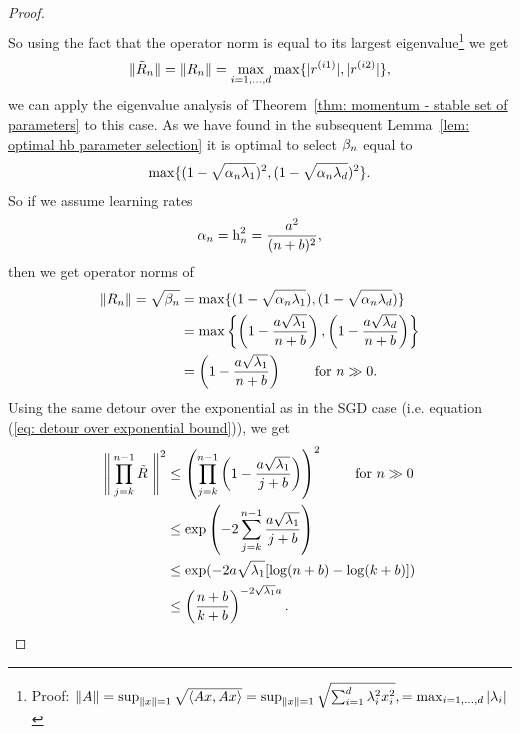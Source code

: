 \begin{proof}
\begin{align*}
	\end{align*}
	So using the fact that the operator norm is equal to its largest eigenvalue\footnote{
		Proof: \(
			\|A\|
			= \sup_{\|x\| =1} \sqrt{\langle Ax, Ax\rangle}
			= \sup_{\|x\| =1} \sqrt{\sum_{i=1}^d \lambda_i^2 x_i^2},
			= \max_{i=1,\dots,d} |\lambda_i|
		\)
	}
	we get
	\begin{align*}
		\|\tilde{R}_n\|=\|R_n\|
		=\max_{i=1,\dots, d} \max\{|r^{(i1)}|,|r^{(i2)}|\},
	\end{align*}
	we can apply the eigenvalue analysis of
	Theorem~\ref{thm: momentum - stable set of parameters} to this case. As we have
	found in the subsequent Lemma~\ref{lem: optimal hb parameter selection} it is
	optimal to select \(\beta_n\) equal to
	\begin{align*}
		\max\{(1-\sqrt{\alpha_n\lambda_1})^2, (1-\sqrt{\alpha_n\lambda_d})^2\}.
	\end{align*}
	So if we assume learning rates
	\begin{align*}
		\alpha_n = \text{h}_n^2 = \frac{a^2}{(n+b)^2},
	\end{align*}
	then we get operator norms of 
	\begin{align*}
		\|R_n\| = \sqrt{\beta_n}
		&= \max\{(1-\sqrt{\alpha_n\lambda_1}), (1-\sqrt{\alpha_n\lambda_d})\}\\
		&= \max\left\{
			\left(1-\frac{a\sqrt{\lambda_1}}{n+b}\right),
			\left(1-\frac{a\sqrt{\lambda_d}}{n+b}\right)
		\right\}\\
		&= \left(1-\frac{a\sqrt{\lambda_1}}{n+b}\right) \qquad \text{ for } n \gg 0.
	\end{align*}
	Using the same detour over the exponential as in the SGD case
	(i.e. equation (\ref{eq: detour over exponential bound})),
	we get \begin{align*}
		\Bigg\|\prod_{j=k}^{n-1}\tilde{\momMatrix}\ \Bigg\|^2
		&\le \left(\prod_{j=k}^{n-1} \left(1-\frac{a\sqrt{\hesseEV_1}}{j+b}\right)\right)^2
		\qquad \text{ for } n \gg 0\\
		&\le \exp\left(-2\sum_{j=k}^{n-1}\frac{a\sqrt{\hesseEV_1}}{j+b}\right)\\
		&\le \exp(-2a\sqrt{\hesseEV_1}[\log(n+b)-\log(k+b)])\\
		&\le \left(\frac{n+b}{k+b}\right)^{-2\sqrt{\hesseEV_1} a}.

\end{align*}
\end{proof}

